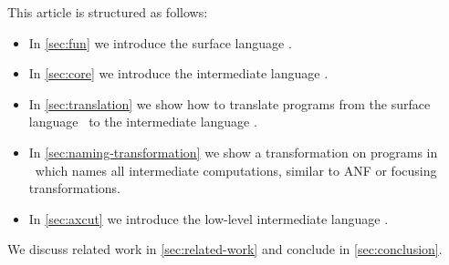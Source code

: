 This article is structured as follows:
\begin{itemize}
    \item In \cref{sec:fun} we introduce the surface language \surfacelang.
    \item In \cref{sec:core} we introduce the intermediate language \targetlang.
    \item In \cref{sec:translation} we show how to translate programs from the surface language \surfacelang\ to the intermediate language \targetlang.
    \item In \cref{sec:naming-transformation} we show a transformation on programs in \targetlang\ which names all intermediate computations, similar to ANF or focusing transformations.
    \item In \cref{sec:axcut} we introduce the low-level intermediate language \machinelang.
\end{itemize}
We discuss related work in \cref{sec:related-work} and conclude in \cref{sec:conclusion}.
